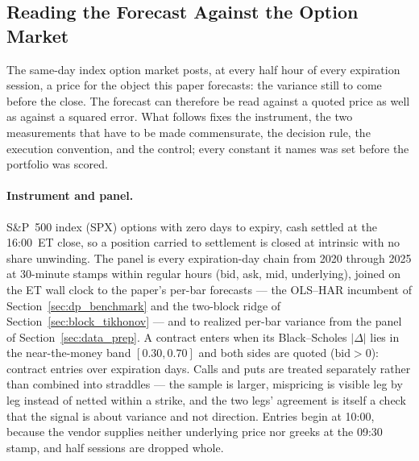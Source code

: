 \ifdefined\optNContracts\else\fi

\subsection{Reading the Forecast Against the Option Market}
\label{sec:options_methods}


The same-day index option market posts, at every half hour of every
expiration session, a price for the object this paper forecasts: the
variance still to come before the close. The forecast can therefore be
read against a quoted price as well as against a squared error. What
follows fixes the instrument, the two measurements that have to be made
commensurate, the decision rule, the execution convention, and the
control; every constant it names was set before the portfolio was scored.

\paragraph{Instrument and panel.} S\&P~500 index (SPX) options with zero
days to expiry, cash settled at the 16:00~ET close, so a position carried
to settlement is closed at intrinsic with no share unwinding. The panel
is every expiration-day chain from 2020 through 2025 at 30-minute stamps
within regular hours (bid, ask, mid, underlying), joined on the ET wall
clock to the paper's per-bar forecasts --- the OLS--HAR incumbent of
Section~\ref{sec:dp_benchmark} and the two-block ridge of
Section~\ref{sec:block_tikhonov} --- and to realized per-bar variance
from the panel of Section~\ref{sec:data_prep}. A contract enters when its
Black--Scholes $|\Delta|$ lies in the near-the-money band $[0.30, 0.70]$
and both sides are quoted ($\mathrm{bid} > 0$): \optNContracts{} contract
entries over \optNDays{} expiration days. Calls and puts are treated
separately rather than combined into straddles --- the sample is larger,
mispricing is visible leg by leg instead of netted within a strike, and
the two legs' agreement is itself a check that the signal is about
variance and not direction. Entries begin at 10:00, because the vendor
supplies neither underlying price nor greeks at the 09:30 stamp, and half
sessions are dropped whole.

